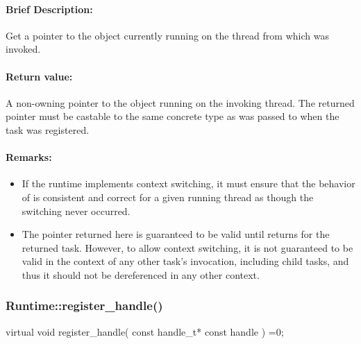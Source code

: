 \paragraph{Brief Description:} Get a pointer to the  object currently running on the thread 
from which  was invoked.

\paragraph{Return value:} A non-owning pointer to the  object running on the invoking
thread.  The returned pointer must be castable to the same concrete type as was passed to  when the task was registered.

\paragraph{Remarks:}
\begin{itemize}
\item If the runtime implements context switching, it must ensure that
     the behavior of  is consistent and correct for a given
     running thread as though the switching never occurred.
\item The pointer returned here is guaranteed to be valid until  returns for
     the returned task.  However, to allow context switching, it is not guaranteed to be valid
     in the context of any other task's  invocation, including child tasks, and thus it should
     not be dereferenced in any other context.
\end{itemize}

\subsubsection{Runtime::register\_handle()}
\begin{CppCode}
virtual void register_handle(
      const handle_t* const handle
    ) =0;
\end{CppCode}

